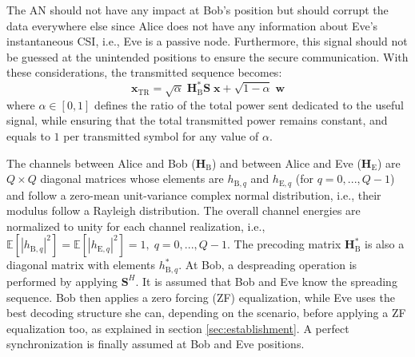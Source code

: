 \documentclass[journal,comsoc]{IEEEtran}
\newcommand{\HE}{\textbf{H}_{\text{E}}}
\newcommand{\HB}{\textbf{H}_{\text{B}}}
\newcommand{\spread}{\textbf{S}}
\newcommand{\w}{\textbf{w}}
\newcommand{\mat}[1]{\boldsymbol{\mathrm{#1}}}
\begin{document}
The AN should not have any impact at Bob's position but should corrupt the data everywhere else since Alice does not have any information about Eve's instantaneous CSI, i.e., Eve is a passive node. Furthermore, this signal should not be guessed at the unintended positions to ensure the secure communication. With these considerations, the transmitted sequence becomes:
\begin{equation}
	\textbf{x}_{\text{TR}} = \sqrt{\alpha} \;\HB^*  \spread\; \textbf{x} +  \sqrt{1-\alpha} \; \w
	\label{eq:sym_rad_AN}
\end{equation} 
where $\alpha \in [0,1]$ defines the ratio of the total power sent dedicated to the useful signal, while ensuring that the total transmitted power remains constant, and equals to $1$ per transmitted symbol for any value of $\alpha$.

The channels between Alice and Bob ($\HB$) and between Alice and Eve ($\HE$) are $Q\times Q$ diagonal matrices whose elements are $h_{\text{B},q}$ and $h_{\text{E},q}$ (for $q = 0,...,Q-1$) and follow a zero-mean unit-variance complex normal distribution, i.e., their modulus follow a Rayleigh distribution. The overall channel energies are normalized to unity for each channel realization, i.e., $\mathbb{E}\left[\left|h_{\text{B},q}\right|^2\right]  = \mathbb{E}\left[\left|h_{\text{E},q}\right|^2\right] = 1, \; q = 0,...,Q-1$. The precoding matrix $\HB^*$ is also a diagonal matrix with elements $h_{\text{B},q}^*$. At Bob, a despreading operation is performed by applying $\spread^H$. It is assumed that Bob and Eve know the spreading sequence. Bob then applies a zero forcing (ZF) equalization, while Eve uses the best decoding structure \mat{G} she can, depending on the scenario, before applying a ZF equalization too, as explained in section \ref{sec:establishment}. A perfect synchronization is finally assumed at Bob and Eve positions.\\







%
\end{document}
